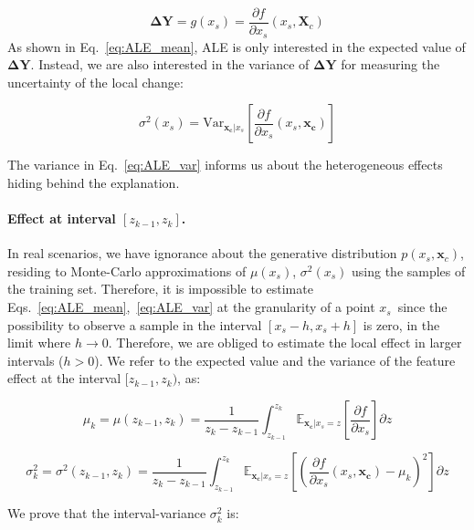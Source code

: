 \documentclass{article}
\newcommand{\dfdx}{\frac{\partial f}{\partial x_s}}
\newcommand{\xc}{\mathbf{x_c}}
\newcommand{\DY}{\mathbf{\Delta Y}}
\begin{document}
\begin{equation}
  \label{eq:fe_rv}
  \DY = g(x_s) = \dfdx (x_s, \mathbf{X}_c)
\end{equation}
%
As shown in Eq.~\eqref{eq:ALE_mean}, ALE is only interested in the expected value of \(\DY\).
Instead, we are also interested in the variance of \(\DY\) for measuring the uncertainty of the local change:

\begin{equation}
  \label{eq:ALE_var}
  \sigma^2(x_s) = \mathrm{Var}_{\xc|x_s}\left [\dfdx (x_s, \xc) \right ]
\end{equation}

\noindent
The variance in Eq.~\eqref{eq:ALE_var} informs us about the heterogeneous
effects hiding behind the explanation.

\paragraph{Effect at interval \([z_{k-1}, z_k]\).}

In real scenarios, we have ignorance about the generative distribution \(p(x_s, \mathbf{x}_c)\),
residing to Monte-Carlo approximations of \(\mu(x_s)\), \(\sigma^2(x_s)\) using the samples of the training set.
Therefore, it is impossible to estimate Eqs.~\eqref{eq:ALE_mean},~\eqref{eq:ALE_var} at the granularity of a
point \(x_s\)\, since the  possibility to observe a sample in the interval
\([x_s - h, x_s + h]\) is zero, in the limit where \(h \to 0\).
Therefore, we are obliged to estimate the local effect in larger intervals (\(h>0\)).
We refer to the expected value and the variance of the feature effect at the interval \([z_{k-1}, z_k)\), as:

\begin{equation}
  \label{eq:mu_bin}
  \mu_k = \mu(z_{k-1}, z_k) = \frac{1}{z_k - z_{k-1}} \int_{z_{k-1}}^{z_k}
  \mathbb{E}_{\xc|x_s=z}\left [\frac{\partial f}{\partial x_s} \right ] \partial z
\end{equation}

\noindent

\begin{equation}
  \label{eq:var_bin}
  \sigma^2_k = \sigma^2(z_{k-1}, z_k) = \frac{1}{z_k - z_{k-1}} \int_{z_{k-1}}^{z_k}
  \mathbb{E}_{\xc|x_s=z} \left [ (\frac{\partial
      f}{\partial x_s}(x_s, \xc) - \mu_k )^2 \right] \partial z
\end{equation}

\noindent
We prove that the interval-variance \(\sigma^2_k \) is:
\end{document}
